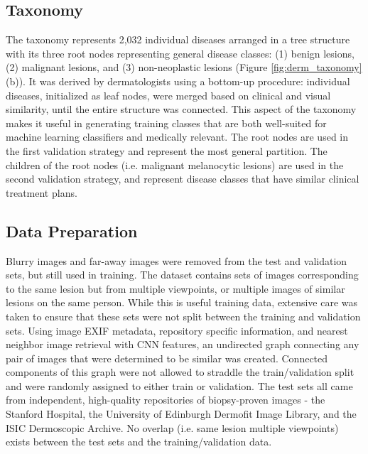 \subsection{Taxonomy}
The taxonomy represents 2,032 individual diseases arranged in a tree structure with its three root nodes representing general disease classes: (1) benign lesions, (2) malignant lesions, and (3) non-neoplastic lesions (Figure \ref{fig:derm_taxonomy}(b)). It was derived by dermatologists using a bottom-up procedure: individual diseases, initialized as leaf nodes, were merged based on clinical and visual similarity, until the entire structure was connected. This aspect of the taxonomy makes it useful in generating training classes that are both well-suited for machine learning classifiers and medically relevant. The root nodes are used in the first validation strategy and represent the most general partition. The children of the root nodes (i.e. malignant melanocytic lesions) are used in the second validation strategy, and represent disease classes that have similar clinical treatment plans.

\subsection{Data Preparation}
Blurry images and far-away images were removed from the test and validation sets, but still used in training. The dataset contains sets of images corresponding to the same lesion but from multiple viewpoints, or multiple images of similar lesions on the same person. While this is useful training data, extensive care was taken to ensure that these sets were not split between the training and validation sets. Using image EXIF metadata, repository specific information, and nearest neighbor image retrieval with CNN features, an undirected graph connecting any pair of images that were determined to be similar was created. Connected components of this graph were not allowed to straddle the train/validation split and were randomly assigned to either train or validation. The test sets all came from independent, high-quality repositories of biopsy-proven images - the Stanford Hospital, the University of Edinburgh Dermofit Image Library, and the ISIC Dermoscopic Archive. No overlap (i.e. same lesion multiple viewpoints) exists between the test sets and the training/validation data.

